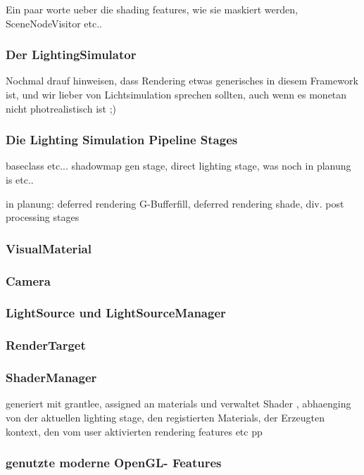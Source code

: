 
\label{sec:visualDomain}
	
Ein paar worte ueber die shading features, wie sie maskiert werden, SceneNodeVisitor etc..

\subsubsection{Der LightingSimulator}
	Nochmal drauf hinweisen, dass Rendering etwas generisches in diesem Framework ist, und wir lieber von Lichtsimulation sprechen sollten, auch wenn es monetan nicht photrealistisch ist ;)

\subsubsection{Die Lighting Simulation Pipeline Stages}
	baseclass etc...
	shadowmap gen stage, direct lighting stage, was noch in planung is etc..

	in planung: deferred rendering G-Bufferfill, deferred rendering shade, div. post processing stages
	
\subsubsection{VisualMaterial}
	\label{sec:visualMaterial}
	
\subsubsection{Camera}


\subsubsection{LightSource und LightSourceManager}
	
	
\subsubsection{RenderTarget}	
	

\subsubsection{ShaderManager}
	generiert mit grantlee, assigned an materials und verwaltet Shader , abhaenging von der aktuellen lighting stage, den registierten Materials,
	der Erzeugten kontext, den vom user aktivierten rendering features etc pp

\subsubsection{genutzte moderne OpenGL- Features}	
	\label{sec:usedOpenGLfeatures}

